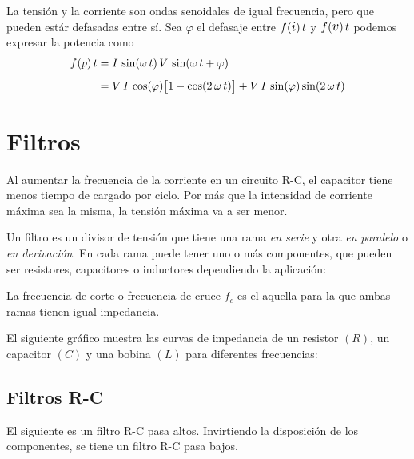 La tensión y la corriente son ondas senoidales de igual frecuencia, pero que pueden estár defasadas entre sí.
Sea $\varphi$ el defasaje entre $\fx{\current}{t}$ y $\fx{\voltage}{t}$ podemos expresar la potencia como
\begin{align*}
    f \hspace{-0.5mm} \left( p \right){t} &= I \, \sin (\omega \, t) \, V \, \sin (\omega \, t + \varphi)
    \\[1ex]
    &= V \, I \, \cos (\varphi) { \begin{bmatrix} 1 - \cos(2 \, \omega \, t) \end{bmatrix} } + V \, I \, \sin (\varphi) \sin (2 \, \omega \, t)
\end{align*}


\section{Filtros}

Al aumentar la frecuencia de la corriente en un circuito R-C, el capacitor tiene menos tiempo de cargado por ciclo.
Por más que la intensidad de corriente máxima sea la misma, la tensión máxima va a ser menor.

Un filtro es un divisor de tensión que tiene una rama \emph{en serie} y otra \emph{en paralelo} o \emph{en derivación}.
En cada rama puede tener uno o más componentes, que pueden ser resistores, capacitores o inductores dependiendo la aplicación:

\begin{center}
    \def\svgwidth{0.6\linewidth}
    
\end{center}

La frecuencia de corte o frecuencia de cruce $f_c$ es el aquella para la que ambas ramas tienen igual impedancia.

El siguiente gráfico muestra las curvas de impedancia de un resistor $(R)$, un capacitor $(C)$ y una bobina $(L)$ para diferentes frecuencias:

\begin{center}
    \def\svgwidth{0.7\linewidth}
    
\end{center}


\subsection{Filtros R-C}

El siguiente es un filtro R-C pasa altos.
Invirtiendo la disposición de los componentes, se tiene un filtro R-C pasa bajos.

\begin{center}
    \def\svgwidth{0.6\linewidth}
    
\end{center}

